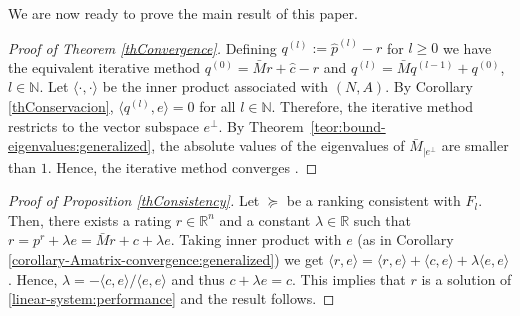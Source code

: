 \documentclass[a4paper,10pt]{article}
\theoremstyle{remark}
\newcommand{\TM}{A} %
\newcommand{\MM}{M} %
\newcommand{\rv}{r} %
\newcommand{\pv}{p} %
\begin{document}
We are now ready to prove the main result of this paper.

\begin{proof}[Proof of Theorem \ref{thConvergence}]
Defining $q^{(l)}:=\hat \pv^{(l)}-\rv$ for $l\geq 0$ we have the
equivalent iterative method $q^{(0)}=\bar {\MM} \rv+\hat c-\rv$
and $q^{(l)}=\bar {\MM} q^{(l-1)}+q^{(0)}$, $l\in\mathbb{N}$. Let
$\langle\cdot,\cdot\rangle$ be the inner product associated with
$(N,\TM)$. By Corollary \ref{thConservacion}, $\langle
q^{(l)},e\rangle=0$ for all $l\in\mathbb{N}$. Therefore, the
iterative method restricts to the vector subspace $e^\perp$. By
Theorem~\ref{teor:bound-eigenvalues:generalized}, the absolute
values of the eigenvalues of $\bar {\MM}_{|e^\perp}$ are smaller
than $1$. Hence, the iterative method converges
\citep{Ciarlet:1989}.
\end{proof}

\begin{proof}[Proof of Proposition \ref{thConsistency}]
Let $\succeq$ be a ranking consistent with $F_l$. Then, there
exists a rating $r\in\mathbb{R}^n$ and a constant
$\lambda\in\mathbb{R}$ such that $r=p^r+\lambda e=\bar\MM
r+c+\lambda e$. Taking inner product with $e$ (as in Corollary
\ref{corollary-Amatrix-convergence:generalized}) we get $\langle
r,e\rangle=\langle r,e\rangle+\langle c,e\rangle+\lambda\langle
e,e\rangle$. Hence, $\lambda=-\langle c,e\rangle/\langle
e,e\rangle$ and thus $c+\lambda e=\hat{c}$. This implies that $r$
is a solution of \eqref{linear-system:performance} and the result
follows.
\end{proof}
\end{document}
